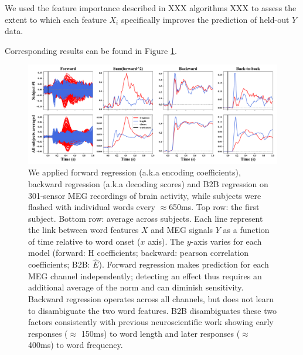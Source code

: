 We used the feature importance described in XXX algorithms XXX to assess the extent to which each feature $X_i$ specifically improves the prediction of held-out $Y$ data.

Corresponding results can be found in Figure \ref{fig:meg_twocurves}.

\begin{figure}[t!]
  \centering
  \includegraphics[width=\textwidth, trim=0cm 0cm 0cm 0cm, clip=True]{figures/meg_twocurves.pdf}
  \caption{We applied forward regression (a.k.a encoding coefficients), backward regression (a.k.a decoding scores) and B2B regression on 301-sensor MEG recordings of brain activity, while subjects were flashed with individual words every $\approx$650ms. Top row: the first subject. Bottom row: average across subjects. Each line represent the link between word features $X$ and MEG signals $Y$
  as a function of time relative to word onset ($x$ axis). The $y$-axis varies for each model (forward: H coefficients; backward: pearson correlation coefficients; B2B: $\hat E$). Forward regression makes prediction for each MEG channel independently; detecting an effect thus requires an additional average of the norm and can diminish sensitivity. Backward regression operates across all channels, but does not learn to disambiguate the two word features. B2B disambiguates these two factors consistently with previous neuroscientific work \cite{kutas2011thirty}\citep{pegado2014timing}
  showing early responses ($\approx$ 150ms) to word length and later responses
  ($\approx$ 400ms) to word frequency.}
  \label{fig:meg_twocurves}
\end{figure}



